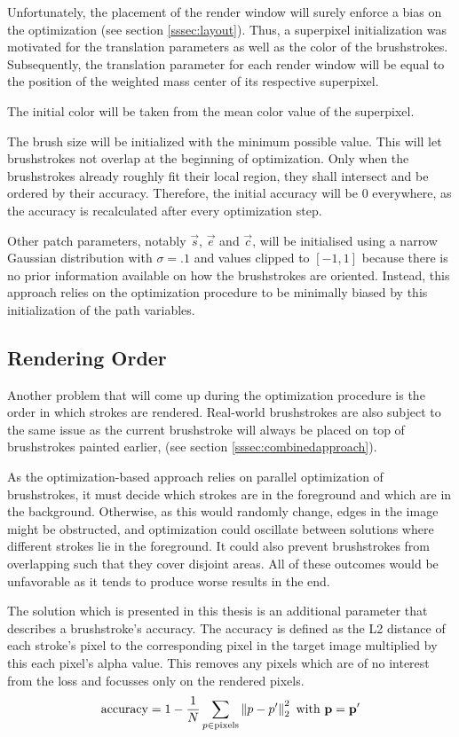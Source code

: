 Unfortunately, the placement of the render window will surely enforce a bias on the optimization (see section \ref{sssec:layout}).
Thus, a superpixel initialization was motivated for the translation parameters as well as the color of the brushstrokes.
Subsequently, the translation parameter for each render window will be equal to the position of the weighted mass center of its respective superpixel.

The initial color will be taken from the mean color value of the superpixel.

The brush size will be initialized with the minimum possible value.
This will let brushstrokes not overlap at the beginning of optimization.
Only when the brushstrokes already roughly fit their local region, they shall intersect and be ordered by their accuracy.
Therefore, the initial accuracy will be 0 everywhere, as the accuracy is recalculated after every optimization step.

Other patch parameters, notably $\vec{s}$, $\vec{e}$ and $\vec{c}$, will be initialised using a narrow Gaussian distribution with $\sigma = .1$ and values clipped to $[-1, 1]$ because there is no prior information available on how the brushstrokes are oriented.
Instead, this approach relies on the optimization procedure to be minimally biased by this initialization of the path variables.



\subsection{Rendering Order}
Another problem that will come up during the optimization procedure is the order in which strokes are rendered.
Real-world brushstrokes are also subject to the same issue as the current brushstroke will always be placed on top of brushstrokes painted earlier, (see section \ref{sssec:combinedapproach}).

As the optimization-based approach relies on parallel optimization of brushstrokes, it must decide which strokes are in the foreground and which are in the background.
Otherwise, as this would randomly change, edges in the image might be obstructed, and optimization could oscillate between solutions where different strokes lie in the foreground.
It could also prevent brushstrokes from overlapping such that they cover disjoint areas.
All of these outcomes would be unfavorable as it tends to produce worse results in the end.

The solution which is presented in this thesis is an additional parameter that describes a brushstroke's accuracy.
The accuracy is defined as the L2 distance of each stroke's pixel to the corresponding pixel in the target image multiplied by this each pixel's alpha value.
This removes any pixels which are of no interest from the loss and focusses only on the rendered pixels.
\begin{align}
    \text{accuracy} = 1 - \frac{1}{N} \sum_{p \in \text{pixels}} \left\lVert p - p'\right\rVert_2^2 \text{ with } \mathbf{p} = \mathbf{p'} 
\end{align}

